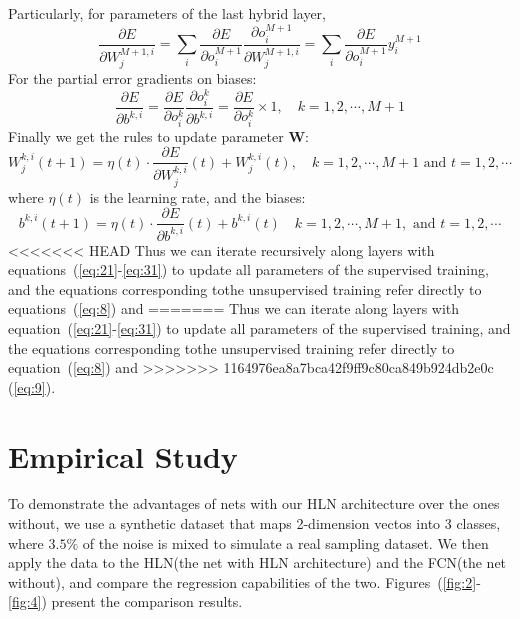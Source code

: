 \documentclass[3p,times,procedia]{elsarticle}
\begin{document}
Particularly, for parameters of the last 
hybrid layer,
\begin{equation}
	\frac{\partial E}
	{\partial W_j^{M+1,i}}=\sum_i
	\frac{\partial E}
	{\partial o_i^{M+1}}
	\frac{\partial o_i^{M+1}}
	{\partial W_j^{M+1,i}}=\sum_i
	\frac{\partial E}
	{\partial o_i^{M+1}}
	y_i^{M+1}
	\label{eq:28}
\end{equation}
For the partial error gradients on biases:
\begin{equation}
	\frac{\partial E}
	{\partial b^{k,i}}=
	\frac{\partial E}
	{\partial o_i^k}
	\frac{\partial o_i^k}
	{\partial b^{k,i}}=
	\frac{\partial E}
	{\partial o_i^k}
	\times 1,
	\quad k=1,2,\cdots,M+1
	\label{eq:29}
\end{equation}
Finally we get the rules to update parameter
$\mathbf{W}$:
\begin{equation}
	W_j^{k,i}(t+1) = \eta(t)\cdot
	\frac{\partial E}{\partial W_j^{k,i}}(t)+
	W_j^{k,i}(t),
	\quad k=1,2,\cdots,M+1
	\text{ and }
	t=1,2,\cdots
	\label{eq:30}
\end{equation}
where $\eta(t)$ is the learning rate, and 
the biases:
\begin{equation}
	b^{k,i}(t+1) = \eta(t)\cdot
	\frac{\partial E}{\partial b^{k,i}}(t)+
	b^{k,i}(t)
	\quad k=1,2,\cdots,M+1,
	\text{ and }
	t=1,2,\cdots
	\label{eq:31}
\end{equation}
<<<<<<< HEAD
Thus we can iterate recursively along 
layers with 
equations~(\ref{eq:21}-\ref{eq:31}) to 
update all parameters of the supervised 
training, and the equations corresponding 
tothe unsupervised training refer 
directly to equations~(\ref{eq:8}) and 
=======
Thus we can iterate along layers with 
equation~(\ref{eq:21}-\ref{eq:31}) to 
update all parameters of the supervised 
training, and the equations corresponding 
tothe unsupervised training refer 
directly to equation~(\ref{eq:8}) and 
>>>>>>> 1164976ea8a7bca42f9ff9c80ca849b924db2e0c
(\ref{eq:9}).
\section{Empirical Study}
To demonstrate the advantages of nets with
our HLN architecture over the ones 
without, 
we use a synthetic dataset that maps
2-dimension vectos into 3 classes, where
$3.5\%$ of the noise is mixed to simulate 
a real sampling dataset.
We then apply the data to the HLN(the 
net with HLN architecture) and the 
FCN(the net without),
and compare the regression capabilities 
of the two. 
Figures~(\ref{fig:2}-\ref{fig:4}) 
present the comparison results.
\end{document}
